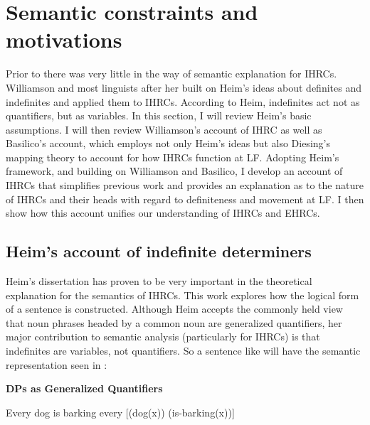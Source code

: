 \documentclass[output=paper]{LSP/langsci}
\begin{document}
\section{Semantic constraints and motivations}\label{sec:boyle:6}

Prior to \citet{Williamson1987} there was very little in the way of semantic explanation for IHRCs. Williamson and most linguists after her built on Heim's \citeyearpar{Heim1982} ideas about definites and indefinites and applied them to IHRCs. According to Heim, indefinites act not as quantifiers, but as variables.  In this section, I will review Heim's basic assumptions. I will then review Williamson's account of IHRC \citeyearpar{Williamson1987} as well as Basilico's \citeyearpar{Basilico1996} account, which employs not only Heim's ideas but also Diesing's mapping theory \citeyearpar{Diesing1990, Diesing1992a, Diesing1992b} to account for how IHRCs function at LF. Adopting Heim's framework, and building on Williamson and Basilico, I develop an account of IHRCs that simplifies previous work and provides an explanation as to the nature of IHRCs and their heads with regard to definiteness and movement at LF. I then show how this account unifies our understanding of IHRCs and EHRCs.

\subsection{Heim's account of indefinite determiners}\label{sec:boyle:6.1}

Heim's \citeyearpar{Heim1982} dissertation has proven to be very important in the theoretical explanation for the semantics of IHRCs. This work explores how the logical form of a sentence is constructed. Although Heim accepts the commonly held view that noun phrases headed by a common noun are generalized quantifiers, her major contribution to semantic analysis (particularly for IHRCs) is that indefinites are variables, not quantifiers.  So a sentence like  will have the semantic representation seen in :

\ea \textbf{DPs as Generalized Quantifiers}
\begin{xlist}
\ex Every dog is barking \label{boyle39a}
\ex every [(dog(x)) (is-barking(x))] \label{boyle39b}
\end{xlist}
\z
\end{document}
